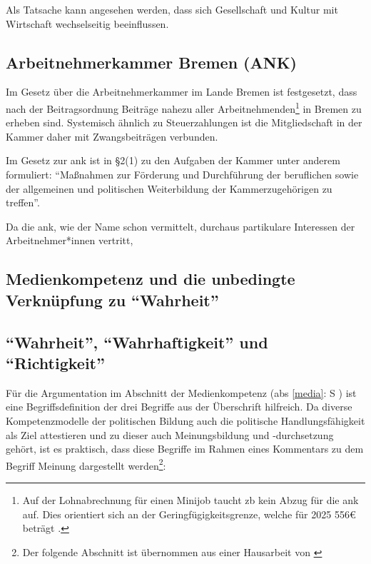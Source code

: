 

Als Tatsache kann angesehen werden, dass sich Gesellschaft und Kultur mit Wirtschaft wechselseitig beeinflussen. 


\subsection{Arbeitnehmerkammer Bremen (ANK)}
Im Gesetz über die Arbeitnehmerkammer im Lande Bremen \autocite[]{ArbnkG} ist festgesetzt, dass nach der Beitragsordnung \autocite[]{ArbnkB} Beiträge nahezu aller Arbeitnehmenden\footnote{ 
Auf der Lohnabrechnung für einen Minijob taucht \gls{zb} kein Abzug für die \gls{ank} auf. Dies orientiert sich an der Geringfügigkeitsgrenze, welche für 2025 556€ beträgt \autocites{b.gering}{banz.gering}.} in Bremen zu erheben sind. Systemisch ähnlich zu Steuerzahlungen ist die Mitgliedschaft in der Kammer daher mit Zwangsbeiträgen verbunden. 

Im Gesetz zur \gls{ank} ist in \S2(1) \autocite[1]{ArbnkG} zu den Aufgaben der Kammer unter anderem formuliert: \enquote{Maßnahmen zur Förderung und Durchführung der beruflichen sowie der allgemeinen und politischen Weiterbildung der Kammerzugehörigen zu treffen}.


Da die \gls{ank}, wie der Name schon vermittelt, durchaus partikulare Interessen der Arbeitnehmer*innen vertritt, 



\subsection{Medienkompetenz und die unbedingte Verknüpfung zu \enquote{Wahrheit} \label{media}} 

\subsection{\enquote{Wahrheit}, \enquote{Wahrhaftigkeit} und \enquote{Richtigkeit} \label{wahr}}

Für die Argumentation im Abschnitt der Medienkompetenz (\gls{abs} \ref{media}: \gls{S} \pageref{media}) ist eine Begriffsdefinition der drei Begriffe aus der Überschrift hilfreich. Da diverse Kompetenzmodelle der politischen Bildung auch die politische Handlungsfähigkeit als Ziel attestieren und zu dieser auch Meinungsbildung und -durchsetzung gehört, ist es praktisch, dass diese Begriffe im Rahmen eines Kommentars zu dem Begriff Meinung dargestellt werden\footnote{Der folgende Abschnitt ist übernommen aus einer Hausarbeit von \textcite[4]{Klein2022}}:

